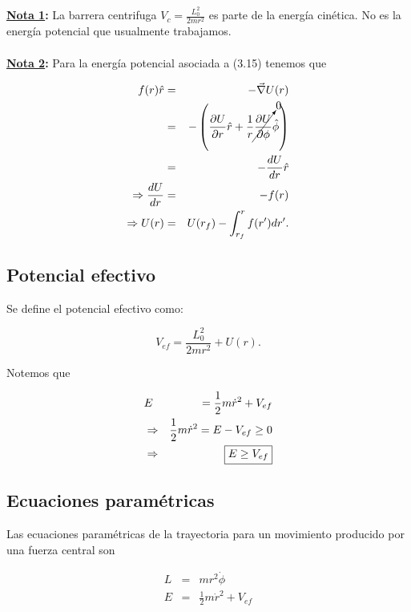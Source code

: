 \documentclass[12pt]{report}
\makeatletter
\newcommand{\commentedbox}[2]{%
  \mbox{
    \begin{tabular}[t]{@{}c@{}}
    $\boxed{\displaystyle#1}$\\
    #2
    \end{tabular}%
  }%
}
\makeatother
\begin{document}
\textbf{\underline{Nota 1}:} La barrera centrifuga $\displaystyle V_c=\frac{L_0^2}{2mr^2}$ es parte de la energía cinética. No es la energía potencial que usualmente trabajamos. \\
\\

\textbf{\underline{Nota 2}:} Para la energía potencial asociada a (3.15) tenemos que

\begin{eqnarray}
f(r)\hat{r} &=& -\vec{\nabla}U(r) \\ 
&=& -\left( \frac{\partial U}{\partial r} \hat{r} + \frac{1}{r} \cancelto{0}{\frac{\partial U}{\partial \phi}} \hat{\phi} \right) \\
&=&- \frac{dU}{dr} \hat{r} \\
\Rightarrow \frac{dU}{dr}&=&-f(r) \\
\Rightarrow U(r)&=&U(r_f) - \int_{r_f}^{r} f(r')dr'.
\end{eqnarray}







\subsection{Potencial efectivo}

Se define el potencial efectivo como:

\begin{equation}
V_{ef}=\frac{L_0^2}{2mr^2 } + U(r).
\end{equation}


Notemos que 

\begin{eqnarray}
&E&= \frac{1}{2}m \dot{r}^2 + V_{ef} \\
&\Rightarrow& \frac{1}{2}m \dot{r}^2 = E-V_{ef} \geq 0 \\
&\Rightarrow& \commentedbox{ E \geq V_{ef}}{}
\end{eqnarray}


\subsection{Ecuaciones paramétricas}

Las ecuaciones paramétricas de la trayectoria para un movimiento producido por una fuerza central son

\begin{eqnarray}
L&=&mr^2 \dot{\phi} \\
E&=&\frac{1}{2}m\dot{r}^2 + V_{ef}
\end{eqnarray}
\end{document}

